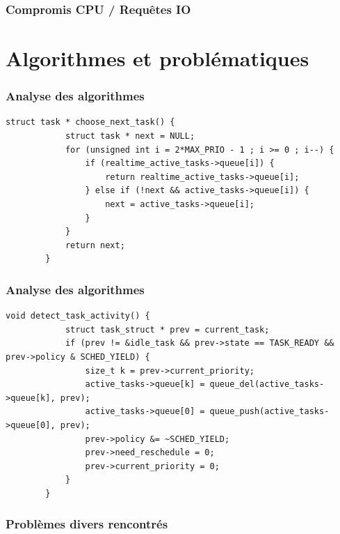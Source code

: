 \documentclass{beamer}
\begin{document}
\begin{frame}
    \frametitle{Compromis CPU / Requêtes IO}

\end{frame}

\section{Algorithmes et problématiques}

\begin{frame}[fragile]
    \frametitle{Analyse des algorithmes}

    \begin{lstlisting}[caption=Choix de la prochaine tâche à exécuter]
        struct task * choose_next_task() {
            struct task * next = NULL;
            for (unsigned int i = 2*MAX_PRIO - 1 ; i >= 0 ; i--) {
                if (realtime_active_tasks->queue[i]) {
                    return realtime_active_tasks->queue[i];
                } else if (!next && active_tasks->queue[i]) {
                    next = active_tasks->queue[i];
                }
            }
            return next;
        }
    \end{lstlisting}
\end{frame}

\begin{frame}[fragile]
    \frametitle{Analyse des algorithmes}

    \begin{lstlisting}[caption=Détection de l'activité d'une tâche (IO/CPU)]
        void detect_task_activity() {
            struct task_struct * prev = current_task;
            if (prev != &idle_task && prev->state == TASK_READY && prev->policy & SCHED_YIELD) {
                size_t k = prev->current_priority;
                active_tasks->queue[k] = queue_del(active_tasks->queue[k], prev);
                active_tasks->queue[0] = queue_push(active_tasks->queue[0], prev);
                prev->policy &= ~SCHED_YIELD;
                prev->need_reschedule = 0;
                prev->current_priority = 0;
            }
        }
    \end{lstlisting}
\end{frame}

\begin{frame}
    \frametitle{Problèmes divers rencontrés}


\end{frame}
\end{document}
